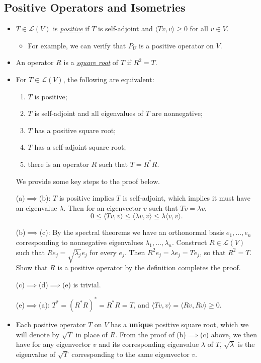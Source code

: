 \documentclass[11pt]{article}
\newcommand{\df}[1]{\ul{\textit{\textsf{#1}}}}
\newcommand{\inp}[2]{\langle #1, #2 \rangle}
\newcommand{\LV}{\mathcal{L}(V)}
\begin{document}
\subsection{Positive Operators and Isometries}
\begin{itemize}
    \item $T \in \LV$ is \df{positive} if $T$ is self-adjoint and $\inp{Tv}{v} \geq 0$ for all $v \in V$.
    \begin{itemize}
        \item For example, we can verify that $P_U$ is a positive operator on $V$.
    \end{itemize}
    \item An operator $R$ is a \df{square root} of $T$ if $R^2 = T$.
    \item For $T \in \LV$, the following are equivalent:
    \begin{enumerate}[label=(\alph*)]
        \item $T$ is positive;
        \item $T$ is self-adjoint and all eigenvalues of $T$ are nonnegative;
        \item $T$ has a positive square root;
        \item $T$ has a self-adjoint square root;
        \item there is an operator $R$ such that $T = R^* R$.
    \end{enumerate}
    We provide some key steps to the proof below.
    
    (a)$\implies$(b): $T$ is positive implies $T$ is self-adjoint, which implies it must have an eigenvalue $\lambda$. Then for an eigenvector $v$ such that $Tv = \lambda v$, $$0 \leq \inp{Tv}{v} \leq \inp{\lambda v}{v} \leq \lambda\inp{v}{v}.$$
    
    (b)$\implies$(c): By the spectral theorems we have an orthonormal basis $e_1,\dots,e_n$ corresponding to nonnegative eigenvalues $\lambda_1,\dots,\lambda_n$. Construct $R \in \LV$ such that $Re_j = \sqrt{\lambda_j} e_j$ for every $e_j$. Then $R^2e_j = \lambda e_j = Te_j$, so that $R^2 = T$. Show that $R$ is a positive operator by the definition completes the proof.
    
    (c)$\implies$(d)$\implies$(e) is trivial.
    
    (e)$\implies$(a): $T^* = (R^*R)^* = R^*R = T$, and $\inp{Tv}{v}=\inp{Rv}{Rv} \geq 0$.
    
    \item Each positive operator $T$ on $V$ has a \textbf{unique} positive square root, which we will denote by $\sqrt{T}$ in place of $R$. From the proof of (b)$\implies$(c) above, we then have for any eigenvector $v$ and its corresponding eigenvalue $\lambda$ of $T$, $\sqrt{\lambda}$ is the eigenvalue of $\sqrt{T}$ corresponding to the same eigenvector $v$.
    

\end{itemize}
\end{document}

